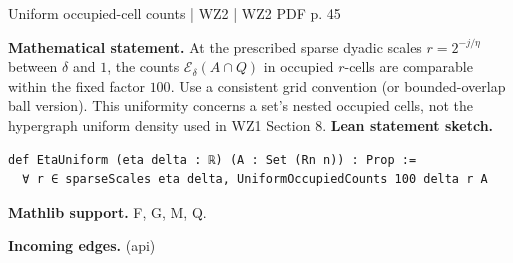 \documentclass[10pt,a4paper]{article}
\newcommand{\nodecard}[1]{\hyperlink{node-#1}{\texttt{\detokenize{#1}}}}
\begin{document}
\begin{minipage}{\linewidth}
\hypertarget{node-W2DUnif}{}
\begin{tcolorbox}[colback=white,colframe=cinematicfg,colbacktitle=cinematicbg,coltitle=ink,boxrule=0.45pt,arc=1.6mm,left=3mm,right=3mm,top=2mm,bottom=2mm,title={\sffamily\bfseries WZ2 Definition 7.8 \hfill \texttt{W2DUnif}}]
{\sffamily\small\color{muted}Uniform occupied-cell counts | WZ2 | WZ2 PDF p. 45}\par
\textbf{Mathematical statement.} At the prescribed sparse dyadic scales $r=2^{-j/\eta}$ between $\delta$ and $1$, the counts $\mathcal E_\delta(A\cap Q)$ in occupied $r$-cells are comparable within the fixed factor $100$.
Use a consistent grid convention (or bounded-overlap ball version).
This uniformity concerns a set's nested occupied cells, not the hypergraph uniform density used in WZ1 Section 8.
\smallskip\textbf{Lean statement sketch.}
\begin{Verbatim}[fontsize=\small,breaklines=true,breakanywhere=true,tabsize=2]
def EtaUniform (eta delta : ℝ) (A : Set (Rn n)) : Prop :=
  ∀ r ∈ sparseScales eta delta, UniformOccupiedCounts 100 delta r A
\end{Verbatim}
{\footnotesize\textbf{Mathlib support.} F, G, M, Q.\par
\textbf{Incoming edges.} \nodecard{Ientropy} (api)\par}

\end{tcolorbox}\end{minipage}\par\medskip
\end{document}

